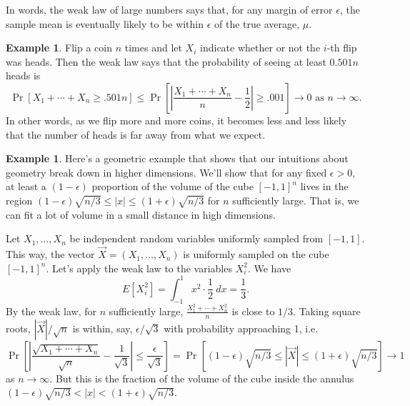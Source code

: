 \documentclass[12pt]{article}
\theoremstyle{plain}
\theoremstyle{definition}
\newtheorem{example}[theorem]{Example}
\theoremstyle{remark}
\begin{document}
In words, the weak law of large numbers says that, for any margin of error $\epsilon$, the sample mean is eventually likely to be within $\epsilon$ of the true average, $\mu$.

\begin{example}
    Flip a coin $n$ times and let $X_i$ indicate whether or not the $i$-th flip was heads.
    Then the weak law says that the probability of seeing at least $0.501n$ heads is
    \[
        \Pr[X_1 + \cdots + X_n \geq .501n] \leq \Pr\left[\left|\frac{X_1 + \cdots + X_n}{n}- \frac{1}{2}\right| \geq .001\right] \to 0\text{ as }n\to \infty.
    \]
    In other words, as we flip more and more coins, it becomes less and less likely that the number of heads is far away from what we expect.
\end{example}

\begin{example}
    Here's a geometric example that shows that our intuitions about geometry break down in higher dimensions.
    We'll show that for any fixed $\epsilon>0$, at least a $(1-\epsilon)$ proportion of the volume of the cube $[-1,1]^n$ lives in the region $(1-\epsilon)\sqrt{n/3}\leq |x| \leq (1+\epsilon)\sqrt{n/3}$ for $n$ sufficiently large.
    That is, we can fit a lot of volume in a small distance in high dimensions.

    Let $X_1, \ldots, X_n$ be independent random variables uniformly sampled from $[-1,1]$.
    This way, the vector $\vec X = (X_1, \ldots, X_n)$ is uniformly sampled on the cube $[-1, 1]^n$.
    Let's apply the weak law to the variables $X_i^2$.
    We have
    \[
        E[X_i^2] = \int_{-1}^1x^2 \cdot \frac{1}{2}\ dx = \frac{1}{3}.
    \]
    By the weak law, for $n$ sufficiently large, $\frac{X_1^2 + \cdots + X_n^2}{n}$ is close to $1/3$.
    Taking square roots, $|\vec X|/\sqrt{n}$ is within, say, $\epsilon/\sqrt{3}$ with probability approaching 1, i.e.
    \[
    \Pr\left[ \left|\frac{\sqrt{X_1 + \cdots + X_n}}{\sqrt{n}} - \frac{1}{\sqrt{3}}\right| \leq \frac{\epsilon}{\sqrt{3}}\right] = \Pr[(1-\epsilon)\sqrt{n/3}\leq |\vec X| \leq (1+\epsilon)\sqrt{n/3} ] \to 1
    \]
    as $n\to \infty$.
    But this is the fraction of the volume of the cube inside the annulus $(1-\epsilon)\sqrt{n/3}<|x|<(1+\epsilon)\sqrt{n/3}$.
\end{example}
\end{document}
